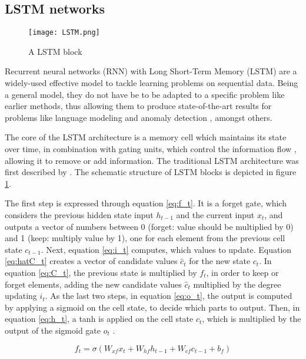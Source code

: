 \subsection{LSTM networks \label{sec:lstm}}
\begin{figure}[h]
  \centering
  \texttt{[image: LSTM.png]}\\
  \caption{A LSTM block \cite{graves2013speech}}
  \label{fig:lstm_blocks}
\end{figure}


Recurrent neural networks (RNN) with Long Short-Term Memory (LSTM) are a widely-used effective model to tackle learning problems on sequential data. Being a general model, they do not have be to be adapted to a specific problem like earlier methods, thus allowing them to produce state-of-the-art results for problems like language modeling \cite{peters2018deep} and anomaly detection \cite{du2017deeplog}, amongst others.

The core of the LSTM architecture is a memory cell which maintains its state over time, in combination with gating units, which control the information flow \cite{greff2016lstm}, allowing it to remove or add information. The traditional LSTM architecture was first described by \cite{graves2005framewise}. The schematic structure of LSTM blocks is depicted in figure \ref{fig:lstm_blocks}. 

The first step is expressed through equation \ref{eq:f_t}. It is a forget gate, which considers the previous hidden state input $h_{t-1}$ and the current input $x_t$, and outputs a vector of numbers between 0 (forget: value should be multiplied by 0) and 1 (keep: multiply value by 1), one for each element from the previous cell state $c_{t-1}$. Next, equation \ref{eq:i_t} computes, which values to update. Equation \ref{eq:hatC_t} creates a vector of candidate values $\hat{c}_t$ for the new state $c_t$. In equation \ref{eq:C_t}, the previous state is multiplied by $f_t$, in order to keep or forget elements, adding the new candidate values $\hat{c}_t$ multiplied by the degree updating $i_t$. As the last two steps, in equation \ref{eq:o_t}, the output is computed by applying a sigmoid on the cell state, to decide which parts to output. Then, in equation \ref{eq:h_t}, a tanh is applied on the cell state $c_t$, which is multiplied by the output of the sigmoid gate $o_t$ \cite{colahlstm} \cite{graves2013speech}.

\begin{equation} \label{eq:f_t}
	f_t = \sigma(W_{xf}x_t + W_{hf}h_{t-1} + W_{cf}c_{t-1} + b_f)
\end{equation}

